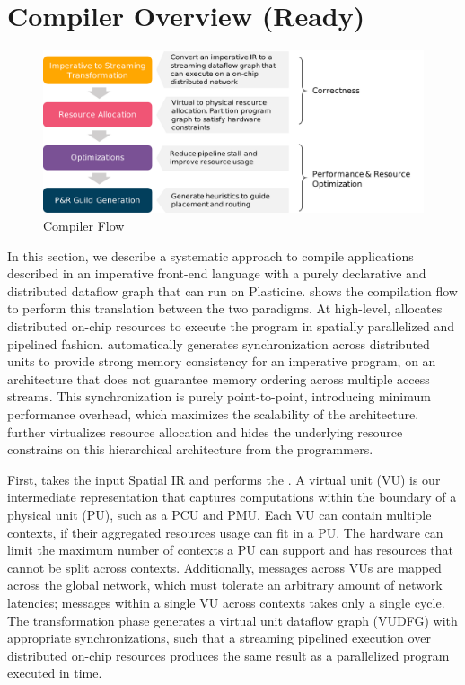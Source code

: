 \section{\name Compiler Overview (Ready)}

\begin{figure}
\centering
\includegraphics[width=1\textwidth]{figs/sarastack.pdf}
\caption[\name Compiler Flow]{\name Compiler Flow}
\label{fig:flow}
\end{figure}
 
In this section, we describe a systematic approach to compile applications described in an
imperative front-end language with a purely declarative and distributed dataflow graph that can
run on Plasticine.
 shows the compilation flow to perform this translation between the two paradigms.
At high-level, \name allocates distributed on-chip resources to execute the program in spatially parallelized and
pipelined fashion.
\name automatically generates synchronization across distributed units to provide strong memory consistency for an imperative program, on an architecture that does not guarantee memory
ordering across multiple access streams.
This synchronization is purely point-to-point, introducing minimum performance overhead, which
maximizes the scalability of the architecture.
\name further virtualizes resource allocation and hides the underlying resource constrains on
this hierarchical architecture from the programmers.

First, \name takes the input Spatial IR and performs the .
A virtual unit (VU) is our intermediate representation that captures computations 
within the boundary of
a physical unit (PU), such as a PCU and PMU.
Each VU can contain multiple contexts, if their aggregated resources usage can fit in a PU.
The hardware can limit the maximum number of contexts a PU can support and has resources that cannot be split across contexts.
Additionally, messages across VUs are mapped across the global network, which must tolerate an arbitrary amount of network latencies; messages within a single VU across contexts takes only a single cycle.
The transformation phase generates a virtual unit dataflow graph (VUDFG) with appropriate
synchronizations, such that a streaming pipelined execution over distributed on-chip resources produces the same result as a
parallelized program executed in time.

